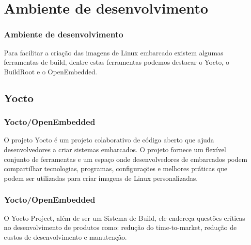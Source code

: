 \section{Ambiente de desenvolvimento}

\begin{frame}
    \frametitle{Ambiente de desenvolvimento}
    Para facilitar a criação das imagens de Linux embarcado 
    existem algumas ferramentas de build, dentre estas ferramentas
    podemos destacar o Yocto, o BuildRoot e o OpenEmbedded.
\end{frame}

\subsection{Yocto}

\begin{frame}
    \frametitle{Yocto/OpenEmbedded}

    O projeto Yocto é um projeto colaborativo de código aberto que
    ajuda desenvolvedores a criar sistemas embarcados. O projeto
    fornece um flexível conjunto de ferramentas e um espaço onde 
    desenvolvedores de embarcados podem compartilhar tecnologias,
    programas, configurações e melhores práticas que podem ser
    utilizadas para criar imagens de Linux personalizadas.
\end{frame}

\begin{frame}
    \frametitle{Yocto/OpenEmbedded}
    O Yocto Project, além de ser um Sistema de Build, ele endereça
    questões críticas no desenvolvimento de produtos como: redução
    do time-to-market, redução de custos de desenvolvimento e
    manutenção.
    

\end{frame}